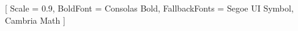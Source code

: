 \usepackage{fontspec}
\usepackage{unicode-math}

\setmainfont{Cambria}
\setsansfont{Calibri}

\setmonofont{Consolas}[
  Scale         = 0.9,
  BoldFont      = {Consolas Bold},
  FallbackFonts = {Segoe UI Symbol, Cambria Math}
]
